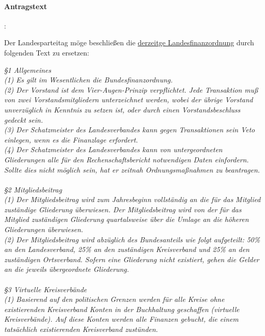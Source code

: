 

\paragraph{Antragstext}:

Der Landesparteitag möge beschließen die \href{http://wiki.piratenpartei.de/LSA:Satzung#Abschnitt_B:_Finanzordnung}{derzeitge Landesfinanzordnung} durch folgenden Text zu ersetzen: 

\textit{§1 Allgemeines\\
(1) Es gilt im Wesentlichen die Bundesfinanzordnung.\\
(2) Der Vorstand ist dem Vier-Augen-Prinzip verpflichtet. Jede Transaktion muß von zwei Vorstandsmitgliedern unterzeichnet werden, wobei der übrige Vorstand unverzüglich in Kenntnis zu setzen ist, oder durch einen Vorstandsbeschluss gedeckt sein.\\
(3) Der Schatzmeister des Landesverbandes kann gegen Transaktionen sein Veto einlegen, wenn es die Finanzlage erfordert.\\
(4) Der Schatzmeister des Landesverbandes kann von untergeordneten Gliederungen alle für den Rechenschaftsbericht notwendigen Daten einfordern. Sollte dies nicht möglich sein, hat er zeitnah Ordnungsmaßnahmen zu beantragen.\\\\
§2 Mitgliedsbeitrag\\
(1) Der Mitgliedsbeitrag wird zum Jahresbeginn vollständig an die für das Mitglied zuständige Gliederung überwiesen. Der Mitgliedsbeitrag wird von der für das Mitglied zuständigen Gliederung quartalsweise über die Umlage an die höheren Gliederungen überwiesen.\\
(2) Der Mitgliedsbeitrag wird abzüglich des Bundesanteils wie folgt aufgeteilt: 50\% an den Landesverband, 25\% an den zuständigen Kreisverband und 25\% an den zuständigen Ortsverband. Sofern eine Gliederung nicht existiert, gehen die Gelder an die jeweils übergeordnete Gliederung.\\\\
§3 Virtuelle Kreisverbände\\
(1) Basierend auf den politischen Grenzen werden für alle Kreise ohne existierenden Kreisverband Konten in der Buchhaltung geschaffen (virtuelle Kreisverbände). Auf diese Konten werden alle Finanzen gebucht, die einem tatsächlich existierenden Kreisverband zustünden.}

